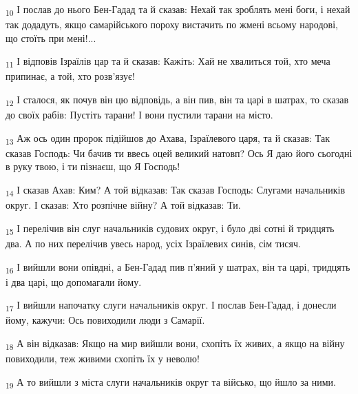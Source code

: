 \begin{tcolorbox}
\textsubscript{10} І послав до нього Бен-Гадад та й сказав: Нехай так зроблять мені боги, і нехай так додадуть, якщо самарійського пороху вистачить по жмені всьому народові, що стоїть при мені!...
\end{tcolorbox}
\begin{tcolorbox}
\textsubscript{11} І відповів Ізраїлів цар та й сказав: Кажіть: Хай не хвалиться той, хто меча припинає, а той, хто розв'язує!
\end{tcolorbox}
\begin{tcolorbox}
\textsubscript{12} І сталося, як почув він цю відповідь, а він пив, він та царі в шатрах, то сказав до своїх рабів: Пустіть тарани! І вони пустили тарани на місто.
\end{tcolorbox}
\begin{tcolorbox}
\textsubscript{13} Аж ось один пророк підійшов до Ахава, Ізраїлевого царя, та й сказав: Так сказав Господь: Чи бачив ти ввесь оцей великий натовп? Ось Я даю його сьогодні в руку твою, і ти пізнаєш, що Я Господь!
\end{tcolorbox}
\begin{tcolorbox}
\textsubscript{14} І сказав Ахав: Ким? А той відказав: Так сказав Господь: Слугами начальників округ. І сказав: Хто розпічне війну? А той відказав: Ти.
\end{tcolorbox}
\begin{tcolorbox}
\textsubscript{15} І перелічив він слуг начальників судових округ, і було дві сотні й тридцять два. А по них перелічив увесь народ, усіх Ізраїлевих синів, сім тисяч.
\end{tcolorbox}
\begin{tcolorbox}
\textsubscript{16} І вийшли вони опівдні, а Бен-Гадад пив п'яний у шатрах, він та царі, тридцять і два царі, що допомагали йому.
\end{tcolorbox}
\begin{tcolorbox}
\textsubscript{17} І вийшли напочатку слуги начальників округ. І послав Бен-Гадад, і донесли йому, кажучи: Ось повиходили люди з Самарії.
\end{tcolorbox}
\begin{tcolorbox}
\textsubscript{18} А він відказав: Якщо на мир вийшли вони, схопіть їх живих, а якщо на війну повиходили, теж живими схопіть їх у неволю!
\end{tcolorbox}
\begin{tcolorbox}
\textsubscript{19} А то вийшли з міста слуги начальників округ та військо, що йшло за ними.
\end{tcolorbox}
